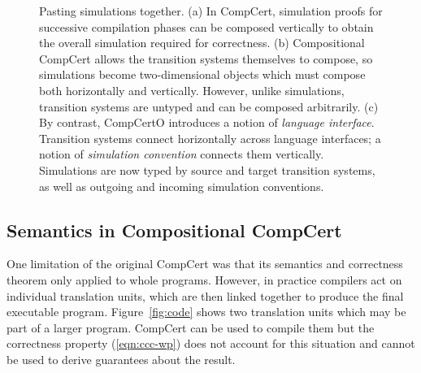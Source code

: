 \documentclass[acmsmall,screen,review,anonymous]{acmart}
\newcommand{\kw}[1]{\ensuremath{ \mathsf{#1} }}
\begin{document}
\begin{figure} %
  \quad
  \caption{%
    Pasting simulations together.
    (a) In CompCert,
    simulation proofs for successive compilation phases
    can be composed vertically to obtain the overall simulation
    required for correctness.
    (b) Compositional CompCert
    allows the transition systems themselves to compose,
    so simulations become two-dimensional objects
    which must compose both horizontally and vertically.
    However, unlike simulations, transition systems are untyped
    and can be composed arbitrarily.
    (c) By contrast,
    CompCertO introduces a notion of \emph{language interface}.
    Transition systems connect horizontally across language interfaces;
    a notion of \emph{simulation convention} connects them vertically.
    Simulations are now typed by source and target transition systems,
    as well as outgoing and incoming simulation conventions.
}
  \label{fig:pasting}
\end{figure}

\subsection{Semantics in Compositional CompCert}

One limitation of the original CompCert was that
its semantics and correctness theorem
only applied to whole programs.
However,
in practice compilers act on individual translation units,
which are then linked together to produce the final executable program.
Figure~\ref{fig:code} shows two translation units
which may be part of a larger program.
CompCert can be used to compile them
but the correctness property (\ref{eqn:ccc-wp})
does not account for this situation and
cannot be used to derive guarantees about the result.
\end{document}
